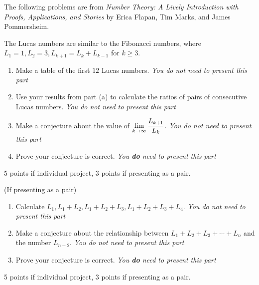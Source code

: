 \documentclass[letterpaper, 11 pt]{ximera}
\begin{document}
\begin{exploration}
 	The following problems are from \emph{Number Theory: A Lively Introduction with Proofs, Applications, and Stories} by Erica Flapan, Tim Marks, and James Pommersheim.

	The Lucas numbers are similar to the Fibonacci numbers, where $L_1=1, L_2=3, L_{k+1}=L_k+L_{k-1}$ for $k\geq3.$ 

	\begin{problem}
 		\begin{enumerate}
 			\item Make a table of the first $12$ Lucas numbers. \emph{You do not need to present this part}
			\item Use your results from part (a) to calculate the ratios of pairs of consecutive Lucas numbers. \emph{You do not need to present this part}
			\item Make a conjecture about the value of  $\displaystyle\lim_{k\to\infty}\frac{L_{k+1}}{L_k}.$ \emph{You do not need to present this part}
			\item Prove your conjecture is correct. \emph{You \textbf{do} need to present this part}
		\end{enumerate}
		\begin{rubric} 5 points if individual project, 3 points if presenting as a pair.
\end{rubric}
	\end{problem}
	
\begin{problem}(If presenting as a pair)
 		\begin{enumerate}
 			\item Calculate $L_1, L_1+L_2, L_1+L_2+L_3, L_1+L_2+L_3+L_4.$ \emph{You do not need to present this part}
			\item Make a conjecture about the relationship between  $L_1+L_2+L_3 +\cdots+L_n$ and the number $L_{n+2}.$ \emph{You do not need to present this part}
			\item Prove your conjecture is correct. \emph{You \textbf{do} need to present this part}
		\end{enumerate}
		\begin{rubric} 5 points if individual project, 3 points if presenting as a pair.
\end{rubric}
\end{problem}
\end{exploration}
\end{document}
